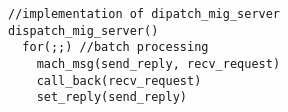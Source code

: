 {\verbatimfont{\itshape\ttfamily}\footnotesize\begin{BVerbatim}
//implementation of dipatch_mig_server
dispatch_mig_server()
  for(;;) //batch processing
    mach_msg(send_reply, recv_request)
    call_back(recv_request)
    set_reply(send_reply)
\end{BVerbatim}
}
\bigskip



